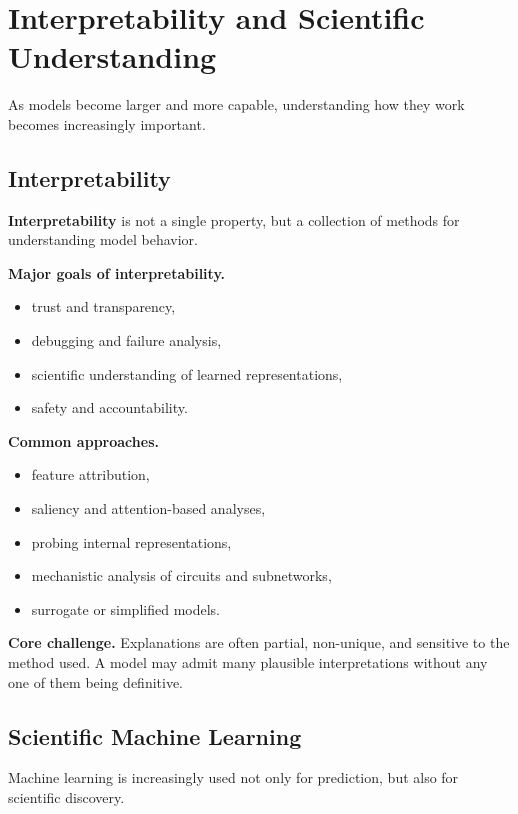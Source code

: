 \section{Interpretability and Scientific Understanding}

As models become larger and more capable, understanding how they work becomes increasingly important.

\subsection{Interpretability}

\textbf{Interpretability} is not a single property, but a collection of methods for understanding model behavior.

\medskip

\noindent
\textbf{Major goals of interpretability.}
\begin{itemize}
    \item trust and transparency,
    \item debugging and failure analysis,
    \item scientific understanding of learned representations,
    \item safety and accountability.
\end{itemize}

\medskip

\noindent
\textbf{Common approaches.}
\begin{itemize}
    \item feature attribution,
    \item saliency and attention-based analyses,
    \item probing internal representations,
    \item mechanistic analysis of circuits and subnetworks,
    \item surrogate or simplified models.
\end{itemize}

\medskip

\noindent
\textbf{Core challenge.}
Explanations are often partial, non-unique, and sensitive to the method used. A model may admit many plausible interpretations without any one of them being definitive.

\subsection{Scientific Machine Learning}

Machine learning is increasingly used not only for prediction, but also for scientific discovery.

